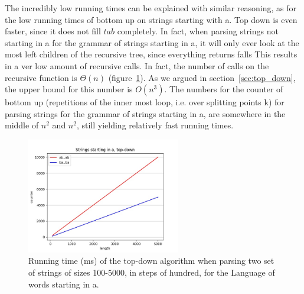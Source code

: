The incredibly low running times can be explained with similar reasoning, as for the low running times of bottom up on strings starting with a.
Top down is even faster, since it does not fill $tab$ completely.
In fact, when parsing strings not starting in a for the grammar of strings starting in a, it will only ever look at the most left children of the recursive tree, since everything returns falls
This results in a ver low amount of recursive calls.
In fact, the number of calls on the recursive function is $\Theta(n)$ (figure~\ref{fig:c_sa_td}).
As we argued in section~\ref{sec:top_down}, the upper bound for this number is $O(n^3)$.
The numbers for the counter of bottom up (repetitions of the inner most loop, i.e. over splitting points k) for parsing strings for the grammar of strings starting in a, are somewhere in the middle of $n^2$ and $n^2$, still yielding relatively fast running times.

\begin{figure}[h!]
    \centering
    \includegraphics[width=0.6\textwidth]{Images/c_sa_td.jpg}
    \caption{Running time (ms) of the top-down algorithm when parsing two set of strings of sizes 100-5000, in steps of hundred, for the Language of words starting in a.}
    \label{fig:c_sa_td}
\end{figure}




